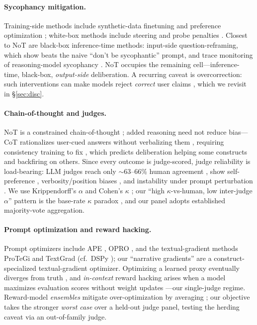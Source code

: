 \documentclass[11pt]{article}
\begin{document}
\paragraph{Sycophancy mitigation.}
Training-side methods include synthetic-data finetuning \citep{wei23syn} and preference optimization
\citep{khan24dpo}; white-box methods include steering \citep{cheng25elephant} and probe penalties
\citep{papadatos24}. Closest to NoT are black-box inference-time methods: input-side question-reframing,
which \citet{dubois26ask} show beats the naive ``don't be sycophantic'' prompt, and trace monitoring of
reasoning-model sycophancy \citep{hu25monica}. NoT occupies the remaining cell---inference-time,
black-box, \emph{output-side} deliberation. A recurring caveat is overcorrection: such interventions can
make models reject \emph{correct} user claims \citep{wei23syn,sharma23}, which we revisit in
\S\ref{sec:disc}.

\paragraph{Chain-of-thought and judges.}
NoT is a constrained chain-of-thought \citep{wei22,kojima22}; added reasoning need not reduce bias---CoT
rationalizes user-cued answers without verbalizing them \citep{turpin23}, requiring consistency training
to fix \citep{chua24}, which predicts deliberation helping some constructs and backfiring on others.
Since every outcome is judge-scored, judge reliability is load-bearing: LLM judges reach only
$\sim$63--66\% human agreement \citep{zheng23judge,dubois23alpacafarm}, show self-preference
\citep{panickssery24}, verbosity/position biases \citep{li24judgesurvey,gu24judgesurvey}, and
instability under prompt perturbation \citep{thakur24judges}. We use Krippendorff's $\alpha$
\citep{krippendorff2004} and Cohen's $\kappa$ \citep{cohen60}; our ``high $\kappa$-vs-human, low
inter-judge $\alpha$'' pattern is the base-rate $\kappa$ paradox \citep{feinstein90kappa}, and our panel
adopts established majority-vote aggregation.

\paragraph{Prompt optimization and reward hacking.}
Prompt optimizers include APE \citep{zhou23ape}, OPRO \citep{yang24opro}, and the textual-gradient
methods ProTeGi \citep{pryzant23protegi} and TextGrad \citep{yuksekgonul2024textgrad} (cf.\ DSPy
\citep{khattab23dspy}); our ``narrative gradients'' are a construct-specialized textual-gradient
optimizer. Optimizing a learned proxy eventually diverges from truth
\citep{strathern97goodhart,amodei16,skalse22,gao23overopt}, and \emph{in-context} reward hacking arises
when a model maximizes evaluation scores without weight updates \citep{pan24hacking}---our single-judge
regime. Reward-model \emph{ensembles} mitigate over-optimization by averaging
\citep{coste24ensemble,eisenstein23herding,rame24warm}; our objective takes the stronger \emph{worst
case} over a held-out judge panel, testing the herding caveat \citep{eisenstein23herding} via an
out-of-family judge.
\end{document}
